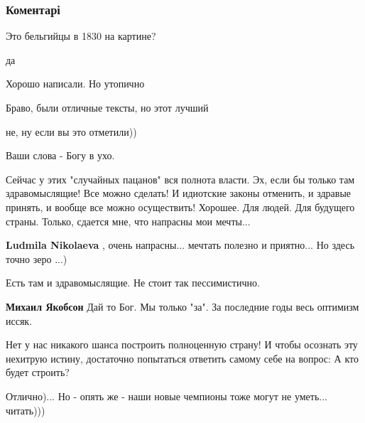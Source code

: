  
 
 
 
 
\subsubsection{Коментарі}

\begin{itemize} %
Это бельгийцы в 1830 на картине?

да

Хорошо написали. Но утопично

Браво, были отличные тексты, но этот лучший

не, ну если вы это отметили))

Ваши слова - Богу в ухо.


Сейчас у этих "случайных пацанов" вся полнота власти. Эх, если бы только там
здравомыслящие! Все можно сделать! И идиотские законы отменить, и здравые
принять, и вообще все можно осуществить! Хорошее. Для людей. Для будущего
страны. Только, сдается мне, что напрасны мои мечты...

\begin{itemize} %
\textbf{Ludmila Nikolaeva} , очень напрасны... мечтать полезно и приятно... Но здесь точно зеро ...)

Есть там и здравомыслящие.
Не стоит так пессимистично.

\textbf{Михаил Якобсон} Дай то Бог. Мы только "за". За последние годы весь оптимизм иссяк.
\end{itemize} %


Нет у нас никакого шанса построить полноценную страну! И чтобы осознать эту
нехитрую истину, достаточно попытаться ответить самому себе на вопрос: А кто
будет строить?


Отлично)... Но - опять же - наши новые чемпионы тоже могут не уметь... читать)))


\end{itemize}
